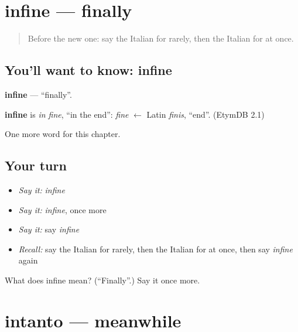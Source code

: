 \section[infine]{infine — finally}

\label{lesson:IT-C153-infine}



\begin{quote}
Before the new one: say the Italian for rarely, then the Italian for at once.
\end{quote}

\subsection*{You'll want to know: infine}
\textbf{infine} — \textquotedblleft{}finally\textquotedblright{}.

\begin{cousinweb}
\textbf{infine} is \emph{in fine}, \textquotedblleft{}in the end\textquotedblright{}: \emph{fine} $\leftarrow$ Latin \emph{finis}, \textquotedblleft{}end\textquotedblright{}. (EtymDB 2.1)
\end{cousinweb}

\begin{grammarlens}[title={What you've built}]
One more word for this chapter.
\end{grammarlens}

\subsection*{Your turn}
\begin{itemize}
\raggedright
  \item \emph{Say it:} \emph{infine}
  \item \emph{Say it:} \emph{infine}, once more
  \item \emph{Say it:} say \emph{infine}
  \item \emph{Recall:} say the Italian for rarely, then the Italian for at once, then say \emph{infine} again
\end{itemize}

\begin{tcolorbox}[breakable,colback=teal!4,colframe=teal!35!black,title={Before you move on}]
What does infine mean? (\textquotedblleft{}Finally\textquotedblright{}.) Say it once more.
\end{tcolorbox}
\section[intanto]{intanto — meanwhile}

